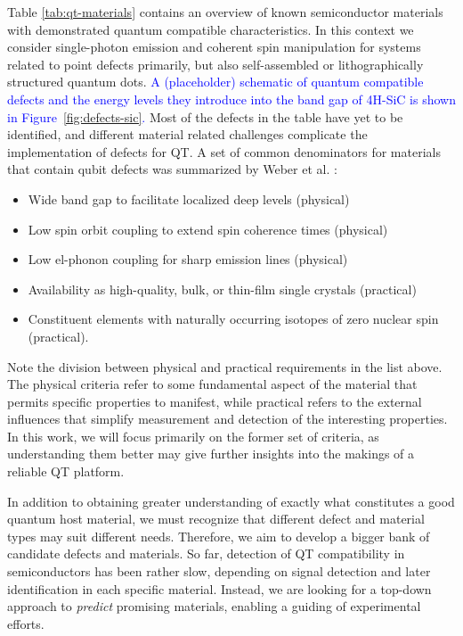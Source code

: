 \documentclass[superscriptaddress,unsortedaddress,
 amsmath,amssymb,
 aps,
]{revtex4-2}
\newcommand{\marianne}[1]{\textcolor{blue}{#1}}
\begin{document}
Table \ref{tab:qt-materials} contains an overview of known semiconductor materials with demonstrated quantum compatible characteristics. In this context we consider single-photon emission and coherent spin manipulation for systems related to point defects primarily, but also self-assembled or lithographically structured quantum dots. 
\marianne{A (placeholder) schematic of quantum compatible defects and the energy levels they introduce into the band gap of 4H-SiC is shown in Figure~\ref{fig:defects-sic}.}
Most of the defects in the table have yet to be identified, and different material related challenges complicate the implementation of defects for QT. 
A set of common denominators for materials that contain qubit defects was summarized by Weber et al. \cite{Weber2010}: 
\begin{itemize}
    \item Wide band gap to facilitate localized deep levels (physical)
    \item Low spin orbit coupling to extend spin coherence times (physical) 
    \item Low el-phonon coupling for sharp emission lines (physical) 
    \item Availability as high-quality, bulk, or thin-film single crystals (practical)
    \item Constituent elements with naturally occurring isotopes of zero nuclear spin (practical). 
\end{itemize}
Note the division between physical and practical requirements in the list above. 
The physical criteria refer to some fundamental aspect of the material that permits specific properties to manifest, while practical refers to the external influences that simplify measurement and detection of the interesting properties. 
In this work, we will focus primarily on the former set of criteria, as understanding them better may give further insights into the makings of a reliable QT platform. 

In addition to obtaining greater understanding of  exactly what constitutes a good quantum host material, we must recognize that different defect and material types may suit different needs. Therefore, we aim to develop a bigger bank of candidate defects and materials. 
So far, detection of QT compatibility in semiconductors has been rather slow, depending on signal detection and later identification in each specific material. 
Instead, we are looking for a top-down approach to \textit{predict} promising materials, enabling a guiding of experimental efforts. 
\end{document}
